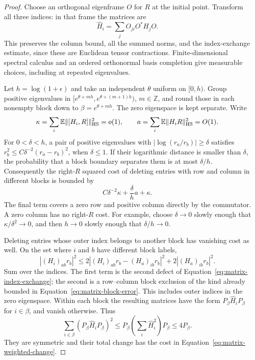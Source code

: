 \begin{proof}
Choose an orthogonal eigenframe $O$ for $R$ at the initial point.  Transform
all three indices: in that frame the matrices are
\[
 \widehat H_i=\sum_jO_{ji}O^*H_jO.
\]
This preserves the column bound, all the summed norms, and the
index-exchange estimate, since these are Euclidean tensor contractions.
Finite-dimensional spectral calculus and an ordered orthonormal basis
completion give measurable choices, including at repeated eigenvalues.

Let $h=\log(1+\epsilon)$ and take an independent $\theta$ uniform on
$[0,h)$.  Group positive eigenvalues in
$[e^{\theta+mh},e^{\theta+(m+1)h})$, $m\in\mathbb Z$, and round those in
each nonempty block down to $\beta=e^{\theta+mh}$.  The zero eigenspace is
kept separate.  Write
\[
 \kappa=\sum_i\mathbb E\|[H_i,R]\|_{\mathrm{HS}}^2=o(1),\qquad
 a=\sum_i\mathbb E\|H_iR\|_{\mathrm{HS}}^2=O(1).
\]
For $0<\delta<h$, a pair of positive eigenvalues with
$|\log(r_a/r_b)|\ge\delta$ satisfies
$r_b^2\le C\delta^{-2}(r_a-r_b)^2$, when $\delta\le1$.
If their logarithmic distance is smaller than $\delta$, the probability
that a block boundary separates them is at most $\delta/h$.  Consequently
the right-$R$ squared cost of deleting entries with row and column in
different blocks is bounded by
\begin{equation}\label{eq:matrix-block-error}
 C\delta^{-2}\kappa+\frac{\delta}{h}a+\kappa.
\end{equation}
The final term covers a zero row and positive column directly by the
commutator.  A zero column has no right-$R$ cost.  For example, choose
$\delta\to0$ slowly enough that $\kappa/\delta^2\to0$, and then
$h\to0$ slowly enough that $\delta/h\to0$.

Deleting entries whose outer index belongs to another block has vanishing
cost as well.  On the set where $i$ and $b$ have different block labels,
\[
 |(H_i)_{ab}r_b|^2
 \le2|(H_i)_{ab}r_b-(H_a)_{ib}r_b|^2
   +2|(H_a)_{ib}r_b|^2.
\]
Sum over the indices.  The first term is the second defect of
Equation~\eqref{eq:matrix-index-exchange}; the second is a row--column block
exclusion of the kind already bounded in
Equation~\eqref{eq:matrix-block-error}.  This includes outer indices in the
zero eigenspace.  Within each block the resulting matrices have the form
$P_\beta\widehat H_iP_\beta$ for $i\in\beta$, and vanish otherwise.  Thus
\[
 \sum_{i\in\beta}(P_\beta\widehat H_iP_\beta)^2
 \le P_\beta\left(\sum_i\widehat H_i^2\right)P_\beta\le4P_\beta.
\]
They are symmetric and their total change has the cost in
Equation~\eqref{eq:matrix-weighted-change}.


\end{proof}
